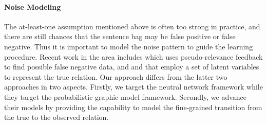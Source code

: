 %


\paragraph{Noise Modeling}
The at-least-one assumption mentioned above is often too strong in practice, and there are still chances that the
sentence bag may be false positive or false negative. Thus it is important to model the noise pattern to guide the learning procedure.
Recent work in the area includes \cite{xu2013filling} which uses pseudo-relevance feedback to find
possible false negative data, and \cite{ritter2013modeling} and \cite{min2013distant} that
employ a set of latent variables to represent the true relation. Our approach differs
from the latter two approaches in two aspects. Firstly, we target the neutral network framework while
they target the probabilistic graphic model framework. Secondly, we
advance their models by providing the capability to model the fine-grained transition from the true to the observed relation.




